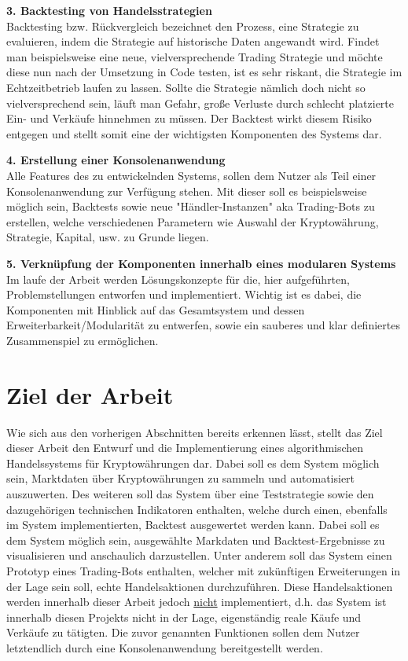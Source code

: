 \documentclass[oneside]{ausarbeitung}
\begin{document}
\textbf{3. Backtesting von Handelsstrategien} \\
Backtesting bzw. Rückvergleich bezeichnet den Prozess, eine Strategie
zu evaluieren, indem die Strategie auf historische Daten angewandt
wird. Findet man beispielsweise eine neue, vielversprechende Trading
Strategie und möchte diese nun nach der Umsetzung in Code testen, ist
es sehr riskant, die Strategie im Echtzeitbetrieb laufen zu lassen.
Sollte die Strategie nämlich doch nicht so vielversprechend sein,
läuft man Gefahr, große Verluste durch schlecht platzierte Ein- und
Verkäufe hinnehmen zu müssen. Der Backtest wirkt diesem Risiko
entgegen und stellt somit eine der wichtigsten Komponenten des Systems
dar. 

\textbf{4. Erstellung einer Konsolenanwendung} \\
Alle Features des zu entwickelnden Systems, sollen dem Nutzer als Teil
einer Konsolenanwendung zur Verfügung stehen. Mit dieser soll es
beispielsweise möglich sein, Backtests sowie neue
"Händler-Instanzen" aka Trading-Bots zu erstellen, welche
verschiedenen Parametern wie Auswahl der Kryptowährung, Strategie,
Kapital, usw. zu Grunde liegen.

\textbf{5. Verknüpfung der Komponenten innerhalb eines modularen Systems} \\
Im laufe der Arbeit werden Lösungskonzepte für die, hier
aufgeführten, Problemstellungen entworfen und implementiert. Wichtig
ist es dabei, die Komponenten mit Hinblick auf das Gesamtsystem und
dessen Erweiterbarkeit/Modularität zu entwerfen, sowie ein sauberes
und klar definiertes Zusammenspiel zu ermöglichen. 

\section{Ziel der Arbeit}
\label{sec:ziel}

Wie sich aus den vorherigen Abschnitten bereits erkennen lässt, stellt das Ziel dieser Arbeit den Entwurf und die Implementierung eines algorithmischen Handelssystems für Kryptowährungen dar. Dabei soll es dem System möglich sein, Marktdaten über Kryptowährungen zu sammeln und automatisiert auszuwerten. Des weiteren soll das System über eine Teststrategie sowie den dazugehörigen technischen Indikatoren enthalten, welche durch einen, ebenfalls im System implementierten, Backtest ausgewertet werden kann. Dabei soll es dem System möglich sein, ausgewählte Markdaten und Backtest-Ergebnisse zu visualisieren und anschaulich darzustellen. Unter anderem soll das System einen Prototyp eines Trading-Bots enthalten, welcher mit zukünftigen Erweiterungen in der Lage sein soll, echte Handelsaktionen durchzuführen. Diese Handelsaktionen werden innerhalb dieser Arbeit jedoch \underline{nicht} implementiert, d.h. das System ist innerhalb diesen Projekts nicht in der Lage, eigenständig reale Käufe und Verkäufe zu tätigten. Die zuvor genannten Funktionen sollen dem Nutzer letztendlich durch eine Konsolenanwendung bereitgestellt werden.
\end{document}
